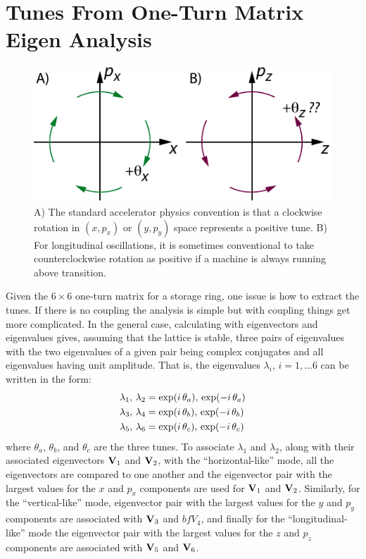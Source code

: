 \section{Tunes From One-Turn Matrix Eigen Analysis}
\label{s:eigen.tune}

\begin{figure}[tb]
  \centering
  \includegraphics[width=5in]{tune.pdf}
  \caption[Illustration of a positive tune]{A) The standard accelerator physics convention is that 
a clockwise rotation in $(x, p_x)$ or $(y, p_y)$ space represents a positive tune. B) For longitudinal
oscillations, it is sometimes conventional to take counterclockwise rotation as positive if a machine
is always running above transition.}
  \label{f:tune}
\end{figure}

Given the $6 \times 6$ one-turn matrix for a storage ring, one issue is how to extract the tunes. If
there is no coupling the analysis is simple but with coupling things get more complicated. In the
general case, calculating with eigenvectors and eigenvalues gives, assuming that the lattice is
stable, three pairs of eigenvalues with the two eigenvalues of a given pair being complex
conjugates and all eigenvalues having unit amplitude. That is, the eigenvalues $\lambda_i$, $i =
1, \ldots 6$ can be written in the form:
\begin{align}
  \lambda_1, \, \lambda_2 &= \exp(i \, \theta_a), \, \exp(-i \, \theta_a) \nonumber \\
  \lambda_3, \, \lambda_4 &= \exp(i \, \theta_b), \, \exp(-i \, \theta_b) \label{lleit} \\
  \lambda_5, \, \lambda_6 &= \exp(i \, \theta_c), \, \exp(-i \, \theta_c) \nonumber
\end{align}
where $\theta_a$, $\theta_b$, and $\theta_c$ are the three tunes. To associate $\lambda_1$ and
$\lambda_2$, along with their associated eigenvectors ${\bf V}_1$ and ${\bf V}_2$, with the
``horizontal-like'' mode, all the eigenvectors are compared to one another and the eigenvector pair
with the largest values for the $x$ and $p_x$ components are used for ${\bf V}_1$ and ${\bf V}_2$.
Similarly, for the ``vertical-like'' mode, eigenvector pair with the largest values for the $y$ and
$p_y$ components are associated with ${\bf V}_3$ and $bfV_4$, and finally for the ``longitudinal-like''
mode the eigenvector pair with the largest values for the $z$ and $p_z$ components are associated
with ${\bf V}_5$ and ${\bf V}_6$.

